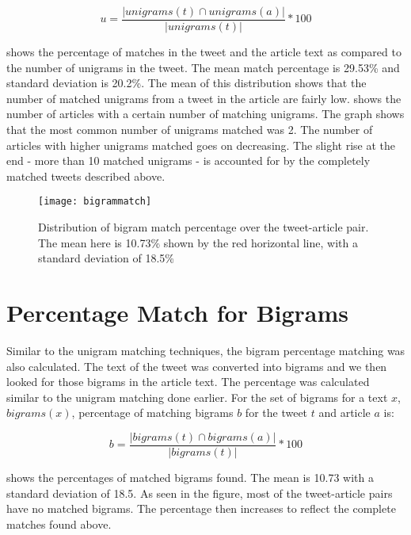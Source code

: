 \begin{equation}
u = \frac{| \textit{unigrams}(t) \cap \textit{unigrams}(a) |}{| \textit{unigrams}(t) |} * 100
\end{equation}

 shows the percentage of matches in the tweet and the article text as compared to the number of unigrams in the tweet. The mean match percentage is 29.53\% and standard deviation is 20.2\%. The mean of this distribution shows that the number of matched unigrams from a tweet in the article are fairly low.  shows the number of articles with a certain number of matching unigrams. The graph shows that the most common number of unigrams matched was 2. The number of articles with higher unigrams matched goes on decreasing. The slight rise at the end - more than 10 matched unigrams - is accounted for by the completely matched tweets described above.

\begin{figure}[!htbp]
\centering
\texttt{[image: bigrammatch]}
\caption[Bigram match percentages]{Distribution of bigram match percentage over the tweet-article pair. The mean here is 10.73\% shown by the red horizontal line, with a standard deviation of 18.5\%}
\label{fig:bigrammatch}
\end{figure}


\section{Percentage Match for Bigrams}
\label{sec:bigrams}

Similar to the unigram matching techniques, the bigram percentage matching was also calculated. The text of the tweet was converted into bigrams and we then looked for those bigrams in the article text. The percentage was calculated similar to the unigram matching done earlier. For the set of bigrams for a text $x$, $\textit{bigrams}(x)$, percentage of matching bigrams $b$ for the tweet $t$ and article $a$ is: 

\begin{equation}
b = \frac{| \textit{bigrams}(t) \cap \textit{bigrams}(a) |}{| \textit{bigrams}(t) |} * 100
\end{equation}

 shows the percentages of matched bigrams found. The mean is 10.73 with a standard deviation of 18.5. As seen in the figure, most of the tweet-article pairs have no matched bigrams. The percentage then increases to reflect the complete matches found above.

